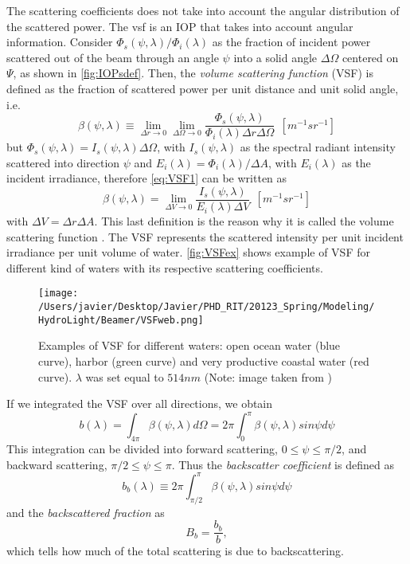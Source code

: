 The scattering coefficients does not take into account the angular distribution of the scattered power. The \gls{vsf} is an IOP that takes into account angular information. Consider $\Phi_s(\psi,\lambda)/\Phi_i(\lambda)$ as the fraction of incident power scattered out of the beam through an angle $\psi$ into a solid angle $\Delta\Omega$ centered on $\Psi$, as shown in \autoref{fig:IOPsdef}. Then, the {\it volume scattering function} (VSF)  is defined as the fraction of scattered power per unit distance and unit solid angle, i.e.
\begin{equation}\label{eq:VSF1}
  \beta(\psi,\lambda)\equiv \lim_{\Delta r\to 0} \lim_{\Delta \Omega\to 0}  \frac{\Phi_s(\psi,\lambda)}{\Phi_i(\lambda)\Delta r\Delta \Omega}~~\left[m^{-1}sr^{-1} \right]
\end{equation}
but $\Phi_s(\psi,\lambda)=I_s(\psi,\lambda)\Delta \Omega$, with $I_s(\psi,\lambda)$ as the spectral radiant intensity scattered into direction $\psi$ and $E_i(\lambda)=\Phi_i(\lambda)/\Delta A$, with $E_i(\lambda)$ as the incident irradiance, therefore \autoref{eq:VSF1} can be written as
\begin{equation} 
  \beta(\psi,\lambda)= \lim_{\Delta V\to 0} \frac{I_s(\psi,\lambda)}{E_i(\lambda)\Delta V}~~\left[m^{-1}sr^{-1} \right]
\end{equation}
with $\Delta V=\Delta r\Delta A$. This last definition is the reason why it is called the volume scattering function \citep{Mobley:2001}. The VSF represents the scattered intensity per unit incident irradiance per unit volume of water. \autoref{fig:VSFex} shows example of VSF for different kind of waters with its respective scattering coefficients.

\begin{figure}[htb]
\centering
      \texttt{[image: /Users/javier/Desktop/Javier/PHD\_RIT/20123\_Spring/Modeling/HydroLight/Beamer/VSFweb.png]}
      \caption{Examples of VSF for different waters: open ocean water (blue curve), harbor (green curve) and very productive coastal water (red curve). $\lambda$ was set equal to $514nm$ (Note: image taken from \citet{Mobley:2001})}
      \label{fig:VSFex}
\end{figure}

If we integrated the VSF over all directions, we obtain
\begin{equation}
  b(\lambda)=\int_{4\pi} \beta(\psi,\lambda)d\Omega=2\pi\int_0^\pi \beta(\psi,\lambda)sin\psi d\psi
\end{equation}
This integration can be divided into forward scattering, $0\leq\psi\leq\pi/2$, and backward scattering, $\pi/2\leq\psi\leq\pi$. Thus the {\it backscatter coefficient}  is defined as
\begin{equation}
  b_b(\lambda)\equiv 2\pi\int_{\pi/2}^\pi \beta(\psi,\lambda)sin\psi d\psi
\end{equation}
and the {\it backscattered fraction}  as 
\begin{equation}
  B_b=\frac{b_b}{b},
\end{equation}
which tells how much of the total scattering is due to backscattering.

